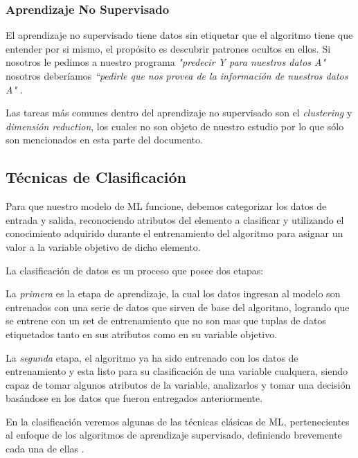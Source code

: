 \doublespacing
\subsubsection{Aprendizaje No Supervisado}
El aprendizaje no supervisado tiene datos sin etiquetar que el algoritmo tiene que entender por si mismo, el propósito es descubrir patrones ocultos en ellos. Si nosotros le pedimos a nuestro programa \textit{"predecir Y para nuestros datos A"} nosotros deberíamos \textit{“pedirle que nos provea de la información de nuestros datos A"} \cite{murdoch2019interpretable}.\\
\par Las tareas más comunes dentro del aprendizaje no supervisado son el \emph{clustering} y \emph{dimensión reduction}, los cuales no son objeto de nuestro estudio por lo que sólo son mencionados en esta parte del documento.\\


\doublespacing
\subsection{Técnicas de Clasificación}
Para que nuestro modelo de ML funcione, debemos categorizar los datos de entrada y salida, reconociendo atributos del elemento a clasificar y utilizando el conocimiento adquirido durante el entrenamiento del algoritmo para asignar un valor a la variable objetivo de dicho elemento.\\
\par La clasificación de datos es un proceso que posee dos etapas:\\
\par La \textit{primera} es la etapa de aprendizaje, la cual los datos ingresan al modelo son entrenados con una serie de datos que sirven de base del algoritmo, logrando que se entrene con un set de entrenamiento que no son mas que tuplas de datos etiquetados tanto en sus atributos como en su variable objetivo.\\
\par La \textit{segunda} etapa, el algoritmo ya ha sido entrenado con los datos de entrenamiento y esta listo para su clasificación de una variable cualquera, siendo capaz de tomar algunos atributos de la variable, analizarlos y tomar una decisión basándose en los datos que fueron entregados anteriormente.\\
\par En la clasificación veremos algunas de las técnicas clásicas de ML, pertenecientes al enfoque de los algoritmos de aprendizaje supervisado, definiendo brevemente cada una de ellas \cite{murdoch2019interpretable}.\\


